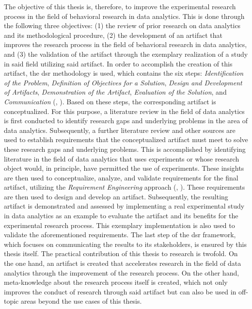 The objective of this thesis is, therefore, to improve the experimental research process in the field of behavioral research in data analytics. This is done through the following three objectives: (1) the review of prior research on data analytics and its methodological procedure, (2) the development of an artifact that improves the research process in the field of behavioral research in data analytics, and (3) the validation of the artifact through the exemplary realization of a study in said field utilizing said artifact. In order to accomplish the creation of this artifact, the \acf{dsr} methodology is used, which contains the six steps: \textit{Identification of the Problem}, \textit{Definition of Objectives for a Solution}, \textit{Design and Development of Artifacts}, \textit{Demonstration of the Artifact}, \textit{Evaluation of the Solution}, and \textit{Communication} (\cite{Peffers.2006}, \cite{Dresch.2015}). Based on these steps, the corresponding artifact is conceptualized. For this purpose, a literature review in the field of data analytics is first conducted to identify research gaps and underlying problems in the area of data analytics. Subsequently, a further literature review and other sources are used to establish requirements that the conceptualized artifact must meet to solve these research gaps and underlying problems. This is accomplished by identifying literature in the field of data analytics that uses experiments or whose research object would, in principle, have permitted the use of experiments. These insights are then used to conceptualize, analyze, and validate requirements for the final artifact, utilizing the \textit{Requirement Engineering} approach (\cite{Sommerville.2011}, \cite{SWEBOK.2004}). These requirements are then used to design and develop an artifact. Subsequently, the resulting artifact is demonstrated and assessed by implementing a real experimental study in data analytics as an example to evaluate the artifact and its benefits for the experimental research process. This exemplary implementation is also used to validate the aforementioned requirements. The last step of the \ac{dsr} framework, which focuses on communicating the results to its stakeholders, is ensured by this thesis itself. The practical contribution of this thesis to research is twofold. On the one hand, an artifact is created that accelerates research in the field of data analytics through the improvement of the research process. On the other hand, meta-knowledge about the research process itself is created, which not only improves the conduct of research through said artifact but can also be used in off-topic areas beyond the use cases of this thesis.
